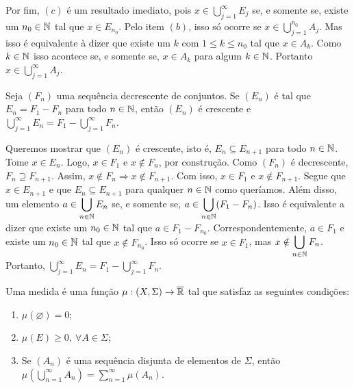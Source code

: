 \begin{prova}
    Por fim, $(c)$ é um resultado imediato, pois $ x \in \displaystyle \bigcup_{j = 1}^\infty E_j$ se, e somente se, 
    existe um $n_0 \in \operatorname{\mathbb{N}}$ tal que $x \in E_{n_0}$. 
    Pelo item $(b)$, isso só ocorre se $x \in \displaystyle \bigcup_{j = 1}^{n_0}A_j$.
    Mas isso é equivalente à dizer que existe um $k$ com $1\leq k\leq n_0$ tal que $x \in A_k$.
    Como $k \in \operatorname{\mathbb{N}}$ isso acontece se, e somente se, $x \in A_k$ para algum $k \in \operatorname{\mathbb{N}}$.
    Portanto $x \in \displaystyle \bigcup_{j = 1}^\infty A_j$.
\end{prova}

\begin{proposition}
\label{prop:sequencia-decrescente-conjuntos-resultado-A_n}
Seja $(F_n)$ uma sequência decrescente de conjuntos. 
Se $(E_n)$ é tal que $E_n = F_1 - F_n$ para todo $n \in \operatorname{\mathbb{N}}$, então $(E_n)$ é crescente e 
$\displaystyle \bigcup_{j = 1}^\infty E_n = \displaystyle F_1 - \bigcup_{j = 1}^\infty F_n$.
\end{proposition}

\begin{prova}
    Queremos mostrar que $(E_n)$ é crescente, isto é, $E_n \subseteq E_{n+1}$ para todo $n \in \operatorname{\mathbb{N}}$.
    Tome $x \in E_n$. Logo, $x \in F_1$ e $x \notin F_n$, por construção.
    Como $(F_n)$ é decrescente, $F_{n} \supseteq F_{n+1}$. 
    Assim, $x \notin F_n \Rightarrow x \notin F_{n+1}$.
    Com isso, $x \in F_1$ e $x \notin F_{n+1}$.
    Segue que $x \in E_{n+1}$ e que $E_n \subseteq E_{n+1}$ para qualquer $n \in \operatorname{\mathbb{N}}$ como queríamos.
    Além disso, um elemento $a \in \displaystyle \bigcup_{n \in \operatorname{\mathbb{N}}} E_n$ se, e somente se,
    $a \in \displaystyle \bigcup_{n \in \operatorname{\mathbb{N}}} (F_1 - F_n)$.
    Isso é equivalente a dizer que existe um $n_0 \in \operatorname{\mathbb{N}}$ tal que $a \in F_1 - F_{n_0}$.
    Correspondentemente, $ a \in F_1$ e existe um $n_0 \in \operatorname{\mathbb{N}}$ tal que $x \notin F_{n_0}$.
    Isso só ocorre se $x \in F_1$, mas $x \notin \displaystyle \bigcup_{n \in \operatorname{\mathbb{N}}} F_n$.
    Portanto, $\displaystyle \bigcup_{j = 1}^\infty E_n = \displaystyle F_1 - \bigcup_{j = 1}^\infty F_n$.
\end{prova}

\begin{definition}
\label{def:medida}
    Uma medida é uma função $\mu: (X, \Sigma) \to \operatorname{\overline{\mathbb{R}}}$ tal que satisfaz as seguintes condições:
    \begin{enumerate}[label* = (\roman*)]
        \item $\mu(\varnothing) = 0$;
        \item $\mu(E) \geq 0, \ \forall A \in \Sigma$;
        \item Se $(A_n)$ é uma sequência disjunta de elementos de  $\Sigma$, então 
        $\displaystyle\mu\left(\bigcup_{n = 1}^\infty A_n\right) = \sum_{n = 1}^\infty\mu(A_n)$.
        
    \end{enumerate}
\end{definition}

